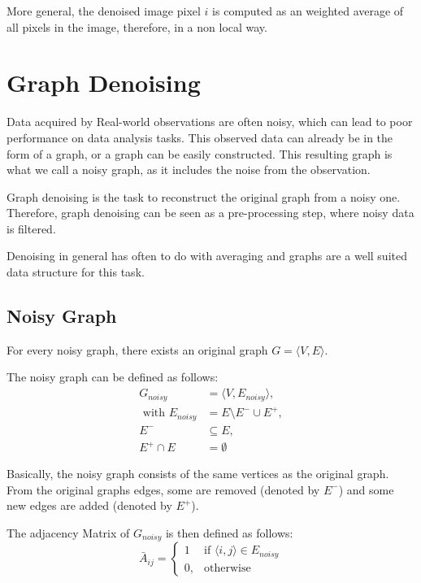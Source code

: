 More general, the denoised image pixel $i$ is computed as an weighted average of all pixels in the 
image, therefore, in a non local way.



\section{Graph Denoising}
Data acquired by Real-world observations are often noisy, which can lead to poor 
performance on data analysis tasks. This observed data can already be in the form of a graph,
or a graph can be easily constructed. This resulting graph is what we call
a noisy graph, as it includes the noise from the observation.

Graph denoising is the task to reconstruct the original graph from a noisy one.
Therefore, graph denoising can be seen as a pre-processing step, where noisy data is filtered.

Denoising in general has often to do with averaging 
 and graphs are  a well suited data structure for this task\cite{noneLocalMean}.

\subsection{Noisy Graph}
For every noisy graph, there exists an original graph $G = \langle V,E \rangle$.

The noisy graph can be defined as follows:
\begin{equation}
    \begin{aligned}
        G_{noisy} &= \langle V,E_{noisy} \rangle,  \\ 
        \text{ with }  E_{noisy} &= E \setminus  E^{-} \cup  E^{+}, \\ 
         E^{-} & \subseteq E, \\
         E^{+} \cap E &= \emptyset
    \end{aligned}
\end{equation}

Basically, the noisy graph consists of the same vertices as the original graph. From
the original graphs edges, some are removed (denoted by $E^{-}$) and some new edges are added
(denoted by $E^{+}$).

The adjacency Matrix of $G_{noisy}$ is then defined as follows:
\begin{equation}
    \bar{A}_{ij} =    
    \begin{cases}
        1  & \text{if } \langle i,j \rangle \in E_{noisy} \\
        0, & \text{otherwise}
    \end{cases}
\end{equation}

